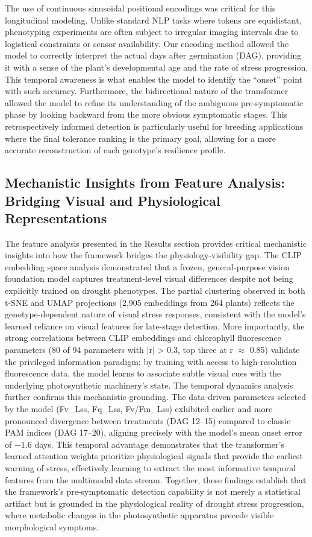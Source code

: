 \documentclass[a4paper,fleqn]{cas-dc}
\begin{document}
The use of continuous sinusoidal positional encodings was critical for this longitudinal modeling. Unlike standard NLP tasks where tokens are equidistant, phenotyping experiments are often subject to irregular imaging intervals due to logistical constraints or sensor availability. Our encoding method allowed the model to correctly interpret the actual days after germination (DAG), providing it with a sense of the plant's developmental age and the rate of stress progression. This temporal awareness is what enables the model to identify the ``onset'' point with such accuracy. Furthermore, the bidirectional nature of the transformer allowed the model to refine its understanding of the ambiguous pre-symptomatic phase by looking backward from the more obvious symptomatic stages. This retrospectively informed detection is particularly useful for breeding applications where the final tolerance ranking is the primary goal, allowing for a more accurate reconstruction of each genotype's resilience profile.

\subsection{Mechanistic Insights from Feature Analysis: Bridging Visual and Physiological Representations}\label{sec:discussion:features}

The feature analysis presented in the Results section provides critical mechanistic insights into how the framework bridges the physiology-visibility gap. The CLIP embedding space analysis demonstrated that a frozen, general-purpose vision foundation model captures treatment-level visual differences despite not being explicitly trained on drought phenotypes. The partial clustering observed in both t-SNE and UMAP projections (2,905 embeddings from 264 plants) reflects the genotype-dependent nature of visual stress responses, consistent with the model's learned reliance on visual features for late-stage detection. More importantly, the strong correlations between CLIP embeddings and chlorophyll fluorescence parameters (80 of 94 parameters with |r| > 0.3, top three at r $\approx$ 0.85) validate the privileged information paradigm: by training with access to high-resolution fluorescence data, the model learns to associate subtle visual cues with the underlying photosynthetic machinery's state. The temporal dynamics analysis further confirms this mechanistic grounding. The data-driven parameters selected by the model (Fv\_Lss, Fq\_Lss, Fv/Fm\_Lss) exhibited earlier and more pronounced divergence between treatments (DAG 12--15) compared to classic PAM indices (DAG 17--20), aligning precisely with the model's mean onset error of $-1.6$ days. This temporal advantage demonstrates that the transformer's learned attention weights prioritize physiological signals that provide the earliest warning of stress, effectively learning to extract the most informative temporal features from the multimodal data stream. Together, these findings establish that the framework's pre-symptomatic detection capability is not merely a statistical artifact but is grounded in the physiological reality of drought stress progression, where metabolic changes in the photosynthetic apparatus precede visible morphological symptoms.
\end{document}
